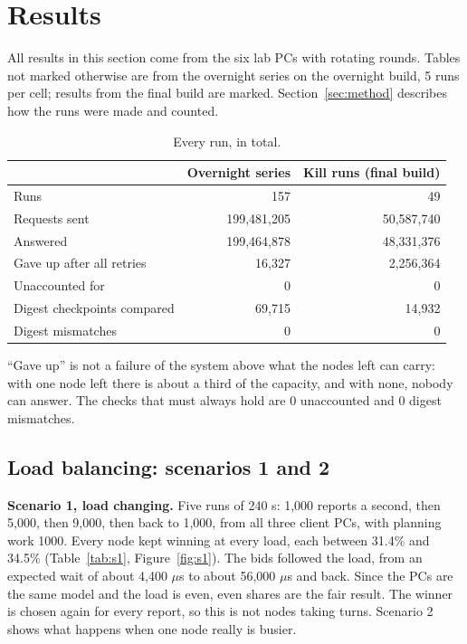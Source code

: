 \section{Results}
\label{sec:results}

All results in this section come from the six lab PCs with rotating rounds. Tables not marked otherwise are from the overnight series on the overnight build, 5 runs per cell; results from the final build are marked. Section~\ref{sec:method} describes how the runs were made and counted.

\begin{table}[!htb]
\centering\small
\caption{Every run, in total.}
\label{tab:totals}
\begin{tabular}{@{}lrr@{}}
\toprule
 & Overnight series & Kill runs (final build) \\
\midrule
Runs & 157 & 49 \\
Requests sent & 199,481,205 & 50,587,740 \\
Answered & 199,464,878 & 48,331,376 \\
Gave up after all retries & 16,327 & 2,256,364 \\
Unaccounted for & 0 & 0 \\
Digest checkpoints compared & 69,715 & 14,932 \\
Digest mismatches & 0 & 0 \\
\bottomrule
\end{tabular}
\end{table}

``Gave up'' is not a failure of the system above what the nodes left can carry: with one node left there is about a third of the capacity, and with none, nobody can answer. The checks that must always hold are 0 unaccounted and 0 digest mismatches.

\subsection{Load balancing: scenarios 1 and 2}
\label{sec:lb}

\textbf{Scenario 1, load changing.} Five runs of 240 s: 1,000 reports a second, then 5,000, then 9,000, then back to 1,000, from all three client PCs, with planning work 1000. Every node kept winning at every load, each between 31.4\% and 34.5\% (Table~\ref{tab:s1}, Figure~\ref{fig:s1}). The bids followed the load, from an expected wait of about 4,400 $\mu$s to about 56,000 $\mu$s and back. Since the PCs are the same model and the load is even, even shares are the fair result. The winner is chosen again for every report, so this is not nodes taking turns. Scenario 2 shows what happens when one node really is busier.

